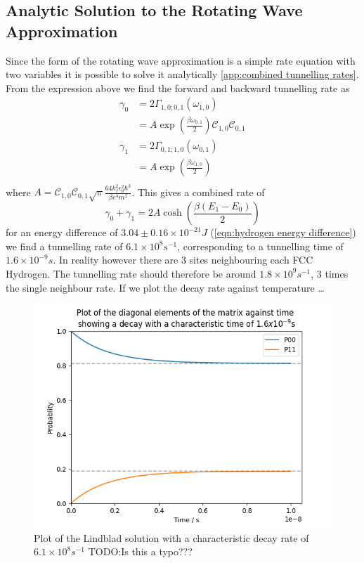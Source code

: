\subsection{Analytic Solution to the Rotating Wave Approximation}
Since the form of the rotating
wave approximation is a simple
rate equation with two variables
it is possible to solve it analytically
\cref{app:combined tunnelling rates}.
From the expression above we find the
forward and backward tunnelling rate as
\begin{align}
    \gamma_0 & = 2\Gamma_{1,0;0, 1}(\omega_{1,0})       \\
             & = A \exp{(\frac{\beta \omega_{0,1}}{2})}
    \mathcal{C}_{1,0} \mathcal{C}_{0,1}                 \\
    \gamma_1 & = 2\Gamma_{0,1;1, 0}(\omega_{0,1})       \\
             & = A \exp{(\frac{\beta \omega_{1,0}}{2})} \\
\end{align}
where
\(A =
\mathcal{C}_{1,0} \mathcal{C}_{0,1}
\sqrt{\pi}
\frac{64 k_f^2 \epsilon_0^2 \hbar^3}{\beta e^4 m^2}\).
This gives a combined rate of
\begin{equation}
    \gamma_0 + \gamma_1 = 2A\cosh{(\frac{\beta (E_1 - E_0)}{2})}
    \label{eqn:theoretical rate lindblad equation}
\end{equation}
for an energy difference of
\(3.04\pm0.16\times{}10^{-21} J\)
(\cref{eqn:hydrogen energy difference})
we find a tunnelling rate of
\(6.1\times{}10^{8}s^{-1}\),
corresponding to a
tunnelling time of
\(1.6\times{}10^{-9}s\).
In reality however there
are 3 sites neighbouring
each FCC Hydrogen. The tunnelling
rate should therefore be around
\(1.8\times{}10^{9}s^{-1}\),
\(3\) times the single
neighbour rate. If we plot
the decay rate against temperature \ldots


\begin{figure}
    \centering
    \includegraphics[width=.5\linewidth]{Figures/Redfield/Plot of lindblad solution.png}
    \caption{Plot of the Lindblad solution with a characteristic decay
    rate of \(6.1\times{}10^{8}s^{-1}\) TODO:Is this a typo???}
\end{figure}

